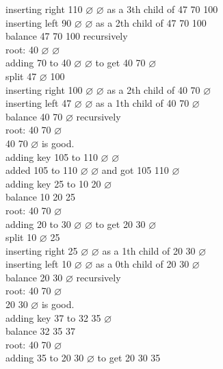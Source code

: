 \documentclass[a4paper,12pt]{article}
\begin{document}
inserting right 110 \(\varnothing\) \(\varnothing\) as a 3th child of 47 70 100\\[0pt]
inserting left 90 \(\varnothing\) \(\varnothing\) as a 2th child of 47 70 100\\[0pt]
balance 47 70 100 recursively\\[0pt]
root: 40 \(\varnothing\) \(\varnothing\)\\[0pt]
adding 70 to 40 \(\varnothing\) \(\varnothing\) to get 40 70 \(\varnothing\)\\[0pt]
split 47 \(\varnothing\) 100\\[0pt]
inserting right 100 \(\varnothing\) \(\varnothing\) as a 2th child of 40 70 \(\varnothing\)\\[0pt]
inserting left 47 \(\varnothing\) \(\varnothing\) as a 1th child of 40 70 \(\varnothing\)\\[0pt]
balance 40 70 \(\varnothing\) recursively\\[0pt]
root: 40 70 \(\varnothing\)\\[0pt]
40 70 \(\varnothing\) is good.\\[0pt]
adding key 105 to 110 \(\varnothing\) \(\varnothing\)\\[0pt]
added 105 to 110 \(\varnothing\) \(\varnothing\) and got 105 110 \(\varnothing\)\\[0pt]
adding key 25 to 10 20 \(\varnothing\)\\[0pt]
balance 10 20 25\\[0pt]
root: 40 70 \(\varnothing\)\\[0pt]
adding 20 to 30 \(\varnothing\) \(\varnothing\) to get 20 30 \(\varnothing\)\\[0pt]
split 10 \(\varnothing\) 25\\[0pt]
inserting right 25 \(\varnothing\) \(\varnothing\) as a 1th child of 20 30 \(\varnothing\)\\[0pt]
inserting left 10 \(\varnothing\) \(\varnothing\) as a 0th child of 20 30 \(\varnothing\)\\[0pt]
balance 20 30 \(\varnothing\) recursively\\[0pt]
root: 40 70 \(\varnothing\)\\[0pt]
20 30 \(\varnothing\) is good.\\[0pt]
adding key 37 to 32 35 \(\varnothing\)\\[0pt]
balance 32 35 37\\[0pt]
root: 40 70 \(\varnothing\)\\[0pt]
adding 35 to 20 30 \(\varnothing\) to get 20 30 35\\[0pt]
\end{document}
